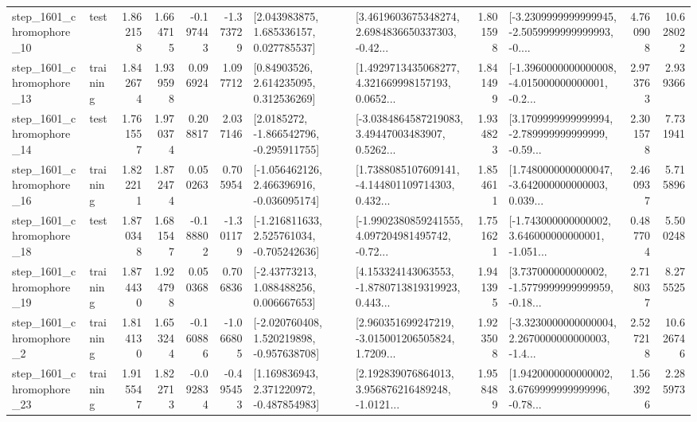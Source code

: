 \begin{tabular}{llrrrrllrlrr}
 step\_1601\_chromophore\_10 &      test &      1.862158 &    1.664715 &     -0.197443 & -1.373729 &     [2.043983875, 1.685336157, 0.027785537] &  [3.4619603675348274, 2.6984836650337303, -0.42... &       1.801598 &  [-3.2309999999999945, -2.5059999999999993, -0.... &            4.760908 &         10.628022 \\
 step\_1601\_chromophore\_13 &  training &      1.842674 &    1.939598 &      0.096924 &  1.097712 &      [0.84903526, 2.614235095, 0.312536269] &  [1.4929713435068277, 4.321669998157193, 0.0652... &       1.841499 &  [-1.3960000000000008, -4.015000000000001, -0.2... &            2.973763 &          2.939366 \\
 step\_1601\_chromophore\_14 &      test &      1.761557 &    1.970374 &      0.208817 &  2.037146 &     [2.0185272, -1.866542796, -0.295911755] &  [-3.0384864587219083, 3.49447003483907, 0.5262... &       1.934823 &  [3.1709999999999994, -2.789999999999999, -0.59... &            2.301578 &          7.731941 \\
 step\_1601\_chromophore\_16 &  training &      1.822211 &    1.872474 &      0.050263 &  0.705954 &   [-1.056462126, 2.466396916, -0.036095174] &  [1.7388085107609141, -4.144801109714303, 0.432... &       1.854611 &  [1.7480000000000047, -3.642000000000003, 0.039... &            2.460937 &          5.715896 \\
 step\_1601\_chromophore\_18 &      test &      1.870348 &    1.681547 &     -0.188802 & -1.301179 &   [-1.216811633, 2.525761034, -0.705242636] &  [-1.9902380859241555, 4.097204981495742, -0.72... &       1.751621 &  [-1.743000000000002, 3.646000000000001, -1.051... &            0.487704 &          5.500248 \\
 step\_1601\_chromophore\_19 &  training &      1.874430 &    1.924798 &      0.050368 &  0.706836 &     [-2.43773213, 1.088488256, 0.006667653] &  [4.153324143063553, -1.8780713819319923, 0.443... &       1.941395 &  [3.737000000000002, -1.5779999999999959, -0.18... &            2.718037 &          8.275525 \\
  step\_1601\_chromophore\_2 &  training &      1.814130 &    1.653244 &     -0.160886 & -1.066805 &   [-2.020760408, 1.520219898, -0.957638708] &  [2.960351699247219, -3.015001206505824, 1.7209... &       1.923508 &  [-3.3230000000000004, 2.2670000000000003, -1.4... &            2.527218 &         10.626746 \\
 step\_1601\_chromophore\_23 &  training &      1.915547 &    1.822713 &     -0.092834 & -0.495453 &    [1.169836943, 2.371220972, -0.487854983] &  [2.192839076864013, 3.956876216489248, -1.0121... &       1.958489 &  [1.9420000000000002, 3.6769999999999996, -0.78... &            1.563926 &          2.285973 \\

\end{tabular}
